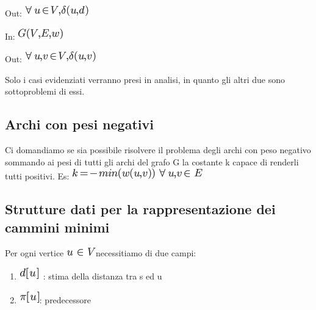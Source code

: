 \documentclass{article}
\providecommand{\tightlist}{%
  \setlength{\itemsep}{0pt}\setlength{\parskip}{0pt}}
\begin{document}
{Out: }\includegraphics{images/image504.png}

{In: }\includegraphics{images/image505.png}

{Out: }\includegraphics{images/image506.png}

{}

{Solo i casi evidenziati verranno presi in analisi, in quanto gli altri
due sono sottoproblemi di essi.}

{}

\subsection{\texorpdfstring{{Archi con pesi
negativi}}{Archi con pesi negativi}}\label{h.tf12b72w5l3}

{Ci domandiamo se sia possibile risolvere il problema degli archi con
peso negativo sommando ai pesi di tutti gli archi del grafo G la
costante k capace di renderli tutti positivi. Es:
}\includegraphics{images/image507.png}

\subsection{\texorpdfstring{{Strutture dati per la rappresentazione dei
cammini
minimi}}{Strutture dati per la rappresentazione dei cammini minimi}}\label{h.ee7q1txmgnne}

{}

{Per ogni vertice }\includegraphics{images/image508.png}{necessitiamo di
due campi:}

\begin{enumerate}
\tightlist
\item
  \includegraphics{images/image509.png}{~: stima della distanza tra s ed
  u}
\item
  \includegraphics{images/image486.png}{: predecessore}
\end{enumerate}
\end{document}
